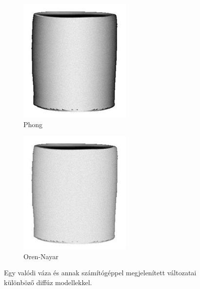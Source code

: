 \begin{figure}[!ht]
\begin{subfigure}[b]{0.25\textwidth}
        \includegraphics[width=\textwidth]{images/vase_b.png}
        \caption{Phong}
    \end{subfigure}
    \hfill
    \begin{subfigure}[b]{0.25\textwidth}
        \includegraphics[width=\textwidth]{images/vase_c.png}
        \caption{Oren-Nayar}
    \end{subfigure}

    \caption{Egy valódi váza és annak számítógéppel megjelenített változatai különböző diffúz modellekkel.}
\end{figure}

